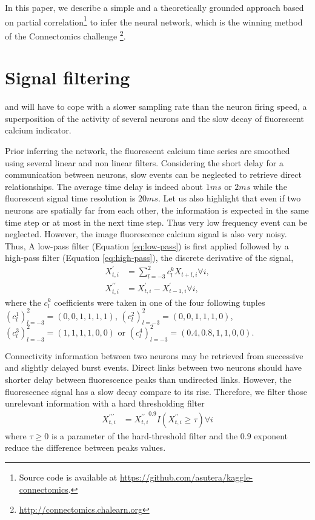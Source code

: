 \documentclass[wcp]{jmlr}
\begin{document}
In this paper, we describe a simple and a theoretically grounded approach
based on partial correlation\footnote{Source code is available at
\url{https://github.com/asutera/kaggle-connectomics}.} to infer the neural
network, which is the winning method of the Connectomics challenge
\footnote{\url{http://connectomics.chalearn.org}}.


\section{Signal filtering} \label{sec:filter}

and will have to cope with
a slower sampling rate than the neuron firing speed, a superposition
of the activity of several neurons and the slow decay of fluorescent calcium
indicator.


Prior inferring the network, the fluorescent calcium time series
are smoothed using several linear and non linear filters.
Considering the short delay for a communication between neurons, slow events
can be neglected to retrieve direct relationships. The average time
delay is indeed about $1ms$ or $2ms$ while the fluorescent signal time
resolution is $20ms$. Let us also highlight that even if two neurons are
spatially far from each other, the information is expected in the same time
step or at most in the next time step. Thus very low frequency event can be neglected.
However, the image fluorescence calcium signal is also very noisy. Thus,
A low-pass filter (Equation \ref{eq:low-pass}) is first applied followed by a
high-pass filter (Equation \ref{eq:high-pass}), the discrete derivative of
the signal,
\begin{align}
X^\prime_{t,i} &= \sum_{l=-3}^2 c_l^k X_{t+l,i} \forall i, \label{eq:low-pass}\\
X^{\prime\prime}_{t,i} &= X^{\prime}_{t,i} - X^{\prime}_{t-1,i} \forall i, \label{eq:high-pass}
\end{align}
where the $c_l^k$ coefficients were taken in one of the four
following tuples
$\left(c_l^1\right)_{l=-3}^2=(0, 0, 1, 1, 1, 1)$,
$\left(c_l^2\right)_{l=-3}^2=(0, 0, 1, 1, 1, 0)$,
$\left(c_l^3\right)_{l=-3}^2=(1, 1, 1, 1, 0, 0)$ or
$\left(c_l^4\right)_{l=-3}^2=(0.4, 0.8, 1, 1, 0, 0)$.

Connectivity information between two neurons may be retrieved from successive
and slightly delayed burst events. Direct links
between two neurons should have shorter delay between fluorescence
peaks than undirected links. However, the fluorescence signal has a slow
decay compare to its rise. Therefore, we filter those unrelevant information
with a hard thresholding filter
\begin{align}
X^{\prime\prime\prime}_{t,i} &=
{X^{\prime\prime}_{t,i}}^{0.9} I(X^{\prime\prime}_{t,i} \geq \tau) \forall i
\label{eq:hard-treshold-filter}
\end{align}
where $\tau \geq 0$ is a parameter of the hard-threshold filter and the $0.9$
exponent reduce the difference between peaks values.
\end{document}
